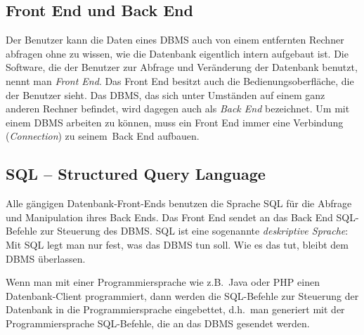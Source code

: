 \subsection{Front End und Back End}

Der Benutzer kann die Daten eines DBMS auch von einem entfernten Rechner
abfragen ohne zu wissen, wie die Datenbank eigentlich intern aufgebaut ist. Die
Software, die der Benutzer zur Abfrage und Veränderung der Datenbank benutzt,
nennt man \emph{Front End}. Das Front End besitzt auch die
Bedienungsoberfläche, die der Benutzer sieht. Das DBMS, das sich unter Umständen
auf einem ganz anderen Rechner befindet, wird dagegen auch als \emph{Back End}
bezeichnet. Um mit einem DBMS arbeiten zu können, muss ein Front End immer eine
Verbindung (\emph{Connection}) zu \glqq seinem\grqq\ Back End aufbauen.

\subsection{SQL -- Structured Query Language}

Alle gängigen Datenbank-Front-Ends benutzen die Sprache SQL für die Abfrage und
Manipulation ihres Back Ends. Das Front End sendet an das Back End SQL-Befehle
zur Steuerung des DBMS. SQL ist eine sogenannte \emph{deskriptive Sprache}:
Mit SQL legt man nur fest, was das DBMS tun soll. Wie es das tut, bleibt dem
DBMS überlassen.

Wenn man mit einer Programmiersprache wie z.B.\ Java oder PHP einen
Datenbank-Client programmiert, dann werden die SQL-Befehle zur Steuerung der
Datenbank in die Programmiersprache \glqq eingebettet\grqq , d.h.\
man generiert mit der Programmiersprache SQL-Befehle, die an das DBMS gesendet
werden.
